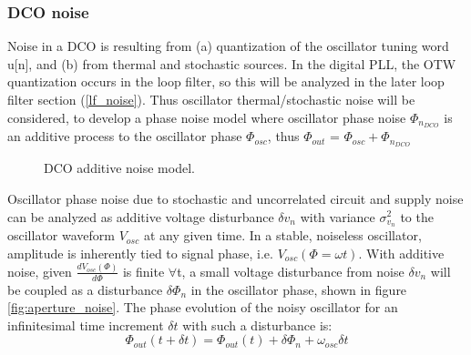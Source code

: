 	\subsubsection{DCO noise}
		Noise in a DCO is resulting from (a) quantization of the oscillator tuning word u[n], and (b) from thermal and stochastic sources. In the digital PLL, the OTW quantization occurs in the loop filter, so this will be analyzed in the later loop filter section (\ref{lf_noise}). Thus oscillator thermal/stochastic noise will be considered, to develop a phase noise model where oscillator phase noise $\Phi_{n_{DCO}}$ is an additive process to the oscillator phase $\Phi_{osc}$, thus $\Phi_{out}$ = $\Phi_{osc} + \Phi_{n_{DCO}}$

		\begin{figure}[htb!]
			\center
			\caption{DCO additive noise model.}
			\label{fig:dco_noise}
		\end{figure}
		\FloatBarrier

		 Oscillator phase noise due to stochastic and uncorrelated circuit and supply noise can be analyzed as additive voltage disturbance $\delta v_n$ with variance $\sigma_{v_n}^2$ to the oscillator waveform $V_{osc}$ at any given time.  In a stable, noiseless oscillator, amplitude is inherently tied to signal phase, i.e. $V_{osc}(\Phi=\omega t)$. With additive noise, given $\frac{dV_{osc}(\Phi)}{d\Phi}$ is finite $\forall$t, a small voltage disturbance from noise $\delta v_{n}$ will be coupled as a disturbance $\delta\Phi_{n}$ in the oscillator phase, shown in figure \ref{fig:aperture_noise}. The phase evolution of the noisy oscillator for an infinitesimal time increment $\delta t$  with such a disturbance is:
		 \begin{equation}
			\Phi_{out}(t+\delta t) = \Phi_{out}(t) + \delta\Phi_n + \omega_{osc}\delta t \label{eq:rwalk_ph}
		 \end{equation}

